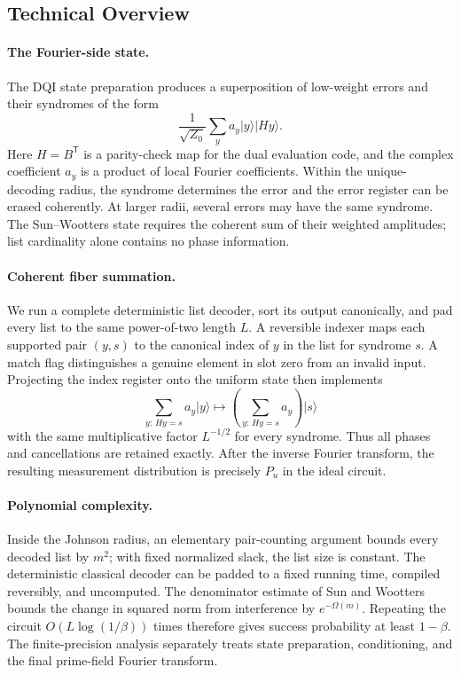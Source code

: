 \documentclass[11pt,letterpaper]{article}
\theoremstyle{definition}
\newcommand{\ket}[1]{\lvert #1\rangle}
\begin{document}
\subsection{Technical Overview}

\paragraph{The Fourier-side state.}
The DQI state preparation produces a superposition of low-weight errors and their syndromes of the form
\begin{equation}
   \frac1{\sqrt{Z_0}}
   \sum_y a_y\ket{y}\ket{Hy}.
   \label{eq:intro-labeled-state}
\end{equation}
Here $H=B^{\mathsf T}$ is a parity-check map for the dual evaluation code, and the complex coefficient $a_y$ is a product of local Fourier coefficients.  Within the unique-decoding radius, the syndrome determines the error and the error register can be erased coherently.  At larger radii, several errors may have the same syndrome.  The Sun--Wootters state requires the coherent sum of their weighted amplitudes; list cardinality alone contains no phase information.

\paragraph{Coherent fiber summation.}
We run a complete deterministic list decoder, sort its output canonically, and pad every list to the same power-of-two length $L$.  A reversible indexer maps each supported pair $(y,s)$ to the canonical index of $y$ in the list for syndrome $s$.  A match flag distinguishes a genuine element in slot zero from an invalid input.  Projecting the index register onto the uniform state then implements
\begin{equation}
   \sum_{y:\,Hy=s}a_y\ket{y}
   \longmapsto
   \left(\sum_{y:\,Hy=s}a_y\right)\ket{s}
   \label{eq:intro-fiber-sum}
\end{equation}
with the same multiplicative factor $L^{-1/2}$ for every syndrome.  Thus all phases and cancellations are retained exactly.  After the inverse Fourier transform, the resulting measurement distribution is precisely $P_u$ in the ideal circuit.

\paragraph{Polynomial complexity.}
Inside the Johnson radius, an elementary pair-counting argument bounds every decoded list by $m^2$; with fixed normalized slack, the list size is constant.  The deterministic classical decoder can be padded to a fixed running time, compiled reversibly, and uncomputed.  The denominator estimate of Sun and Wootters bounds the change in squared norm from interference by $e^{-\Omega(m)}$.  Repeating the circuit $O(L\log(1/\beta))$ times therefore gives success probability at least $1-\beta$.  The finite-precision analysis separately treats state preparation, conditioning, and the final prime-field Fourier transform.
\end{document}
